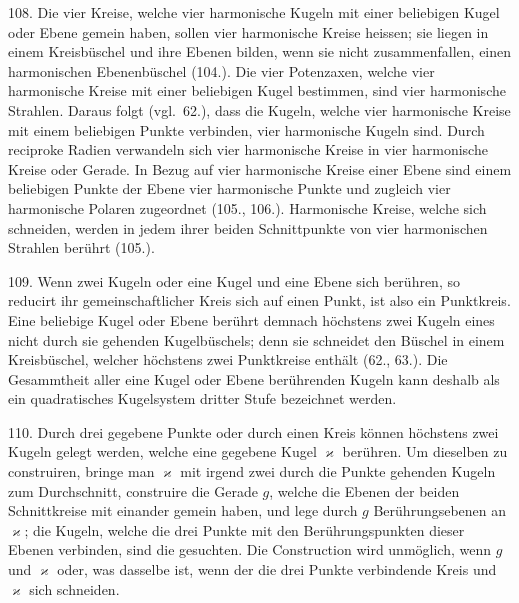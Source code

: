 108. Die vier Kreise, welche vier harmonische Kugeln
mit einer beliebigen Kugel oder Ebene gemein haben, sollen
{\glqq}vier harmonische Kreise{\grqq} heissen; sie liegen in einem
Kreisb\"uschel und ihre Ebenen bilden, wenn sie nicht zusammenfallen,
einen harmonischen Ebenenb\"uschel (104.). Die vier
Potenzaxen, welche vier harmonische Kreise mit einer beliebigen
Kugel bestimmen, sind vier harmonische Strahlen.
Daraus folgt (vgl.~62.), dass die Kugeln, welche vier harmonische
Kreise mit einem beliebigen Punkte verbinden, vier
harmonische Kugeln sind. Durch reciproke Radien verwandeln
sich vier harmonische Kreise in vier harmonische Kreise
oder Gerade. In Bezug auf vier harmonische Kreise einer
Ebene sind einem beliebigen Punkte der Ebene vier harmonische
Punkte und zugleich vier harmonische Polaren zugeordnet
(105., 106.). Harmonische Kreise, welche sich schneiden,
werden in jedem ihrer beiden Schnittpunkte von vier
harmonischen Strahlen ber\"uhrt (105.).

\begin{center}
\makebox[15em]{\hrulefill}
\end{center}


\label{p13}


\hspace{\parindent}%
109. Wenn zwei Kugeln oder eine Kugel und eine Ebene
sich ber\"uhren, so reducirt ihr gemeinschaftlicher Kreis sich
auf einen Punkt, ist also ein Punktkreis. Eine beliebige
Kugel oder Ebene ber\"uhrt demnach h\"ochstens zwei Kugeln
eines nicht durch sie gehenden Kugelb\"uschels; denn sie
schneidet den B\"uschel in einem Kreisb\"uschel, welcher h\"ochstens
zwei Punktkreise enth\"alt (62., 63.). Die Gesammtheit
aller eine Kugel oder Ebene ber\"uhrenden Kugeln kann deshalb
als ein {\glqq}quadratisches Kugelsystem dritter Stufe{\grqq} bezeichnet
werden.

110. Durch drei gegebene Punkte oder durch einen
Kreis k\"onnen h\"och\-stens zwei Kugeln gelegt werden, welche
eine gegebene Kugel $\varkappa$ ber\"uhren. Um dieselben zu construiren,
bringe man $\varkappa$ mit irgend zwei durch die Punkte
gehenden Kugeln zum Durchschnitt, construire die Gerade $g$,
welche die Ebenen der beiden Schnittkreise mit einander
gemein haben, und lege durch $g$ Ber\"uhrungsebenen an $\varkappa$;
die Kugeln, welche die drei Punkte mit den Ber\"uhrungspunkten
dieser Ebenen verbinden, sind die gesuchten. Die
Construction wird unm\"oglich, wenn $g$ und $\varkappa$ oder, was dasselbe
ist, wenn der die drei Punkte verbindende Kreis und
$\varkappa$ sich schneiden.

